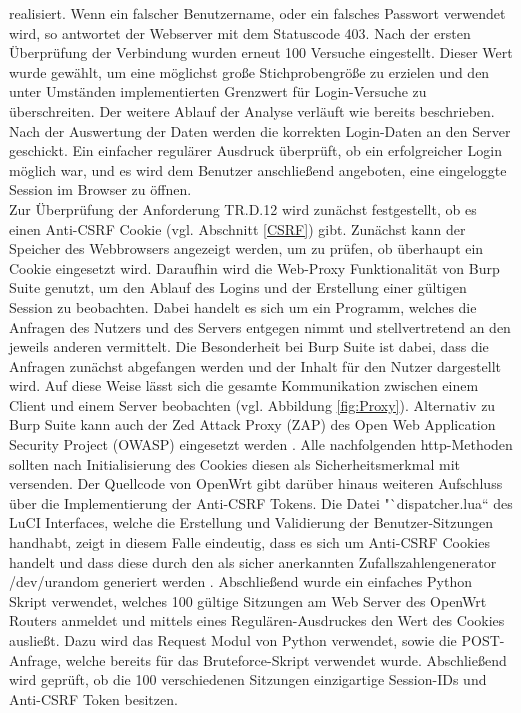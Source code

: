 \documentclass[a4paper]{book}
\begin{document}
\begin{large}
\begin{onehalfspace}
\noindent realisiert. Wenn ein falscher Benutzername, oder ein falsches Passwort verwendet wird, so antwortet der Webserver mit dem Statuscode 403. Nach der ersten Überprüfung der Verbindung wurden erneut 100 Versuche eingestellt. Dieser Wert wurde gewählt, um eine möglichst große Stichprobengröße zu erzielen und den unter Umständen implementierten Grenzwert für Login-Versuche zu überschreiten. Der weitere Ablauf der Analyse verläuft wie bereits beschrieben. Nach der Auswertung der Daten werden die korrekten Login-Daten an den Server geschickt. Ein einfacher regulärer Ausdruck überprüft, ob ein erfolgreicher Login möglich war, und es wird dem Benutzer anschließend angeboten, eine eingeloggte Session im \mbox Browser zu öffnen.	\\ \indent
	Zur Überprüfung der Anforderung TR.D.12 wird zunächst festgestellt, ob es einen Anti-CSRF Cookie (vgl. Abschnitt \ref{CSRF}) gibt. Zunächst kann der Speicher des Webbrowsers angezeigt werden, um zu prüfen, ob überhaupt ein Cookie eingesetzt wird. Daraufhin wird die Web-Proxy Funktionalität von Burp Suite genutzt, um den Ablauf des Logins und der Erstellung einer gültigen Session zu beobachten. Dabei handelt es sich um ein Programm, welches die Anfragen des Nutzers und des Servers entgegen nimmt und stellvertretend an den jeweils anderen vermittelt. Die Besonderheit bei Burp Suite ist dabei, dass die Anfragen zunächst abgefangen werden und der Inhalt für den Nutzer dargestellt wird. Auf diese Weise lässt sich die gesamte Kommunikation zwischen einem Client und einem Server beobachten (vgl. Abbildung \ref{fig:Proxy}). Alternativ zu Burp Suite kann auch der \glqq Zed Attack Proxy\grqq{} (ZAP) des \glqq Open Web Application Security Project\grqq{} (OWASP) eingesetzt werden \cite{ZAP.2020}. Alle nachfolgenden http-Methoden sollten nach Initialisierung des Cookies diesen als Sicherheitsmerkmal mit versenden. Der Quellcode von OpenWrt gibt darüber hinaus weiteren Aufschluss über die Implementierung der Anti-CSRF Tokens. Die Datei "`dispatcher.lua“ des LuCI Interfaces, welche die Erstellung und Validierung der \mbox Benutzer-Sitzungen handhabt, zeigt in diesem Falle eindeutig, dass es sich um Anti-CSRF Cookies handelt und dass diese durch den als sicher anerkannten Zufallszahlengenerator \mbox /dev/urandom generiert werden \cite{OpenWrtLuci.2020, PatrickLacharme.2012}. Abschließend wurde ein einfaches Python Skript verwendet, welches 100 gültige Sitzungen am Web Server des OpenWrt Routers anmeldet und mittels eines Regulären-Ausdruckes den Wert des Cookies ausließt. Dazu wird das Request Modul von Python verwendet, sowie die POST-Anfrage, welche bereits für das Bruteforce-Skript verwendet wurde. Abschließend wird geprüft, ob die 100 verschiedenen Sitzungen einzigartige Session-IDs und Anti-CSRF Token besitzen.	



\end{onehalfspace}
\end{large}
\end{document}
